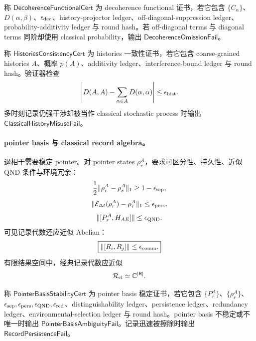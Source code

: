\begin{definition}\label{def:typed-address-biaxial-completion-decoherence-functional-cert}
称 \(\mathsf{DecoherenceFunctionalCert}\) 为 decoherence functional 证书，若它包含 \(\{C_\alpha\}\)、\(D(\alpha,\beta)\)、\(\epsilon_{\rm dec}\)、history-projector ledger、off-diagonal-suppression ledger、probability-additivity ledger 与 round hash。若 off-diagonal terms 与 diagonal terms 同阶却使用 classical probability，输出 \(\mathsf{DecoherenceOmissionFail}\)。
\end{definition}

\begin{definition}\label{def:typed-address-biaxial-completion-histories-consistency-cert}
称 \(\mathsf{HistoriesConsistencyCert}\) 为 histories 一致性证书，若它包含 coarse-grained histories \(A\)、概率 \(p(A)\)、additivity ledger、interference-bound ledger 与 round hash。验证器检查
\[
\left|
D(A,A)-\sum_{\alpha\in A}D(\alpha,\alpha)
\right|
\le
\epsilon_{\rm hist}.
\]
多时刻记录仍强干涉却被当作 classical stochastic process 时输出 \(\mathsf{ClassicalHistoryMisuseFail}\)。
\end{definition}

\paragraph{pointer basis 与 classical record algebra。}
退相干需要稳定 pointer。对 pointer states \(\rho_r^A\)，要求可区分性、持久性、近似 QND 条件与环境冗余：
\[
\frac12\|\rho_r^A-\rho_s^A\|_1\ge1-\epsilon_{\rm sep},
\]
\[
\|\mathcal E_{\Delta t}(\rho_r^A)-\rho_r^A\|_1\le\epsilon_{\rm pers},
\]
\[
\|[P_r^A,H_{AE}]\|\le\epsilon_{\rm QND}.
\]
可见记录代数还应近似 Abelian：
\[
\boxed{
\|[R_i,R_j]\|\le\epsilon_{\rm comm}.
}
\]
有限结果空间中，经典记录代数应近似
\[
\mathcal R_{\rm cl}\simeq\mathbb C^{|\mathsf R|}.
\]

\begin{definition}\label{def:typed-address-biaxial-completion-pointer-basis-stability-cert}
称 \(\mathsf{PointerBasisStabilityCert}\) 为 pointer basis 稳定证书，若它包含 \(\{P_r^A\}\)、\(\{\rho_r^A\}\)、\(\epsilon_{\rm sep},\epsilon_{\rm pers},\epsilon_{\rm QND},\epsilon_{\rm red}\)、distinguishability ledger、persistence ledger、redundancy ledger、environmental-selection ledger 与 round hash。pointer basis 不稳定或不唯一时输出 \(\mathsf{PointerBasisAmbiguityFail}\)。记录迅速被擦除时输出 \(\mathsf{RecordPersistenceFail}\)。
\end{definition}

